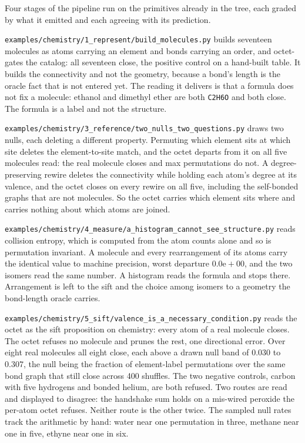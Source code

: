 Four stages of the pipeline run on the primitives already in the tree, each graded by what it emitted
and each agreeing with its prediction.

\texttt{examples/chemistry/1\_represent/build\_molecules.py} builds seventeen molecules as atoms
carrying an element and bonds carrying an order, and octet-gates the catalog: all seventeen close, the
positive control on a hand-built table. It builds the connectivity and not the geometry, because a
bond's length is the oracle fact that is not entered yet. The reading it delivers is that a formula
does not fix a molecule: ethanol and dimethyl ether are both \texttt{C2H6O} and both close. The
formula is a label and not the structure.

\texttt{examples/chemistry/3\_reference/two\_nulls\_two\_questions.py} draws two nulls, each deleting a
different property. Permuting which element sits at which site deletes the element-to-site match, and
the octet departs from it on all five molecules read: the real molecule closes and max permutations
do not. A degree-preserving rewire deletes the connectivity while holding each atom's degree at its
valence, and the octet closes on every rewire on all five, including the self-bonded graphs that are
not molecules. So the octet carries which element sits where and carries nothing about which atoms are
joined.

\texttt{examples/chemistry/4\_measure/a\_histogram\_cannot\_see\_structure.py} reads collision entropy,
which is computed from the atom counts alone and so is permutation invariant. A molecule and every
rearrangement of its atoms carry the identical value to machine precision, worst departure
\(0.0\mathrm{e}{+}00\), and the two isomers read the same number. A histogram reads the formula and stops
there. Arrangement is left to the sift and the choice among isomers to a geometry the bond-length
oracle carries.

\texttt{examples/chemistry/5\_sift/valence\_is\_a\_necessary\_condition.py} reads the octet as the sift
proposition on chemistry: every atom of a real molecule closes. The octet refuses no molecule and
prunes the rest, one directional error. Over eight real molecules all eight close, each above a drawn
null band of 0.030 to 0.307, the null being the fraction of element-label permutations over the same
bond graph that still close across 400 shuffles. The two negative controls, carbon with five hydrogens
and bonded helium, are both refused. Two routes are read and displayed to disagree: the handshake sum
holds on a mis-wired peroxide the per-atom octet refuses. Neither route is the other twice. The
sampled null rates track the arithmetic by hand: water near one permutation in three, methane near one
in five, ethyne near one in six.

